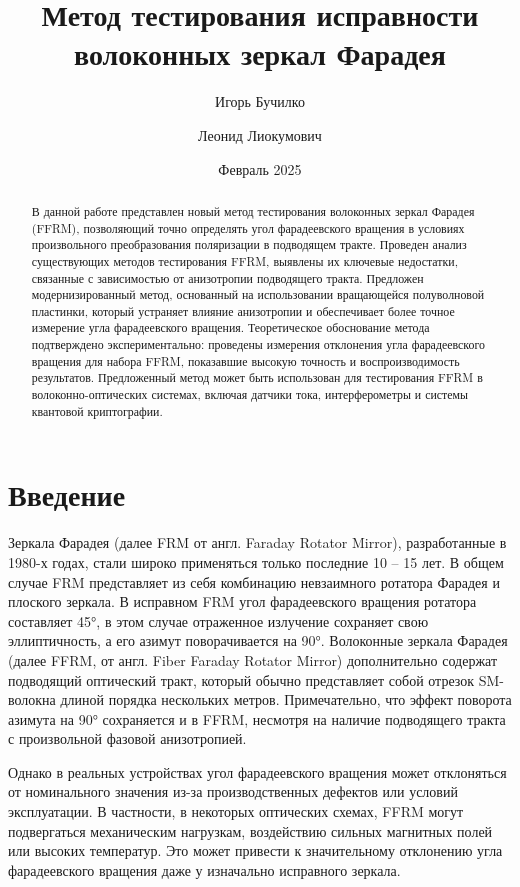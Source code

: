 \documentclass{article}
\title{Метод тестирования исправности волоконных зеркал Фарадея}
\author[1]{Игорь Бучилко}
\author[1]{Леонид Лиокумович}
\affil[1]{Санкт-Петербургский политехнический Университет Петра Великого}
\date{Февраль 2025}
\begin{document}
	
\maketitle
\begin{abstract}
В данной работе представлен новый метод тестирования волоконных зеркал Фарадея (FFRM), позволяющий точно определять угол фарадеевского вращения в условиях произвольного преобразования поляризации в подводящем тракте.
Проведен анализ существующих методов тестирования FFRM, выявлены их ключевые недостатки, связанные с зависимостью от анизотропии подводящего тракта.
Предложен модернизированный метод, основанный на использовании вращающейся полуволновой пластинки, который устраняет влияние анизотропии и обеспечивает более точное измерение угла фарадеевского вращения.
Теоретическое обоснование метода подтверждено экспериментально: проведены измерения отклонения угла фарадеевского вращения для набора FFRM, показавшие высокую точность и воспроизводимость результатов.
Предложенный метод может быть использован для тестирования FFRM в волоконно-оптических системах, включая датчики тока, интерферометры и системы квантовой криптографии.
\end{abstract}

\section{Введение}
Зеркала Фарадея (далее FRM от англ. Faraday Rotator Mirror), разработанные в 1980-х годах,  стали широко применяться только последние 10 – 15 лет.
В общем случае FRM представляет из себя комбинацию невзаимного ротатора Фарадея и плоского зеркала\autocite{paschottaFaradayMirrors2022}.
В исправном FRM угол фарадеевского вращения ротатора составляет 45°, в этом случае отраженное излучение сохраняет свою эллиптичность, а его азимут поворачивается на 90°.
Волоконные зеркала Фарадея (далее FFRM, от англ. Fiber Faraday Rotator Mirror) дополнительно содержат подводящий оптический тракт, который обычно представляет собой отрезок SM-волокна длиной порядка нескольких метров.
Примечательно, что эффект поворота азимута на 90° сохраняется и в FFRM, несмотря на наличие подводящего тракта с произвольной фазовой анизотропией.

Однако в реальных устройствах угол фарадеевского вращения может отклоняться от номинального значения из-за производственных дефектов или условий эксплуатации.
В частности, в некоторых оптических схемах, FFRM могут подвергаться механическим нагрузкам, воздействию сильных магнитных полей или высоких температур.
Это может привести к значительному отклонению угла фарадеевского вращения даже у изначально исправного зеркала.
\end{document}
